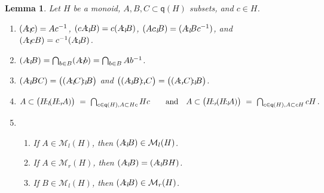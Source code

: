 \documentclass[a4paper]{amsart}
\newtheorem{lemma}[theorem]{Lemma}
\theoremstyle{definition}
\numberwithin{equation}{section}
\begin{document}
\medskip
\begin{lemma} \label{3.2}
Let $H$ be a monoid, $A, B, C \subset \mathsf q (H)$  subsets, and
$c \in H$.
\begin{enumerate}
\item $(A {\negthinspace :_l \negthinspace} c) = Ac^{-1}$, $(cA {\negthinspace :_l \negthinspace} B) = c(A {\negthinspace :_l \negthinspace} B)$, $(Ac {\negthinspace :_l \negthinspace}
      B ) = (A {\negthinspace :_l \negthinspace} Bc^{-1})$, and $(A {\negthinspace :_l \negthinspace} cB) = c^{-1}(A {\negthinspace :_l \negthinspace} B)$.

\smallskip
\item $( A {\negthinspace :_l \negthinspace} B) = \bigcap_{b \in B} (A {\negthinspace :_l \negthinspace} b) = \bigcap_{b \in B} Ab^{-1}$.

\smallskip
\item $(A {\negthinspace :_l \negthinspace} BC) = \big( (A {\negthinspace :_l \negthinspace} C) {\negthinspace :_l \negthinspace} B\big)$ and $\big( (A
      {\negthinspace :_l \negthinspace} B) {\negthinspace :_r \negthinspace} C \big) = \big( (A {\negthinspace :_r \negthinspace} C) {\negthinspace :_l \negthinspace} B \big)$.

\smallskip
\item $
      A \subset \big( H {\negthinspace :_l \negthinspace} (H {\negthinspace :_r \negthinspace} A) \big) \ = \ \bigcap_{c \in \mathsf q (H), A \subset Hc} Hc  \quad  \quad \text{and}
      \quad A \subset \big( H {\negthinspace :_r \negthinspace} (H {\negthinspace :_l \negthinspace} A)\big) \ = \ \bigcap_{c \in \mathsf q (H), A \subset cH} c H \,.
      $

\smallskip
\item \begin{enumerate}
      \item If $A \in \mathcal M_l (H)$, then $(A {\negthinspace :_l \negthinspace} B) \in \mathcal M_l
            (H)$.

      \item If $A \in \mathcal M_r (H)$, then $(A {\negthinspace :_l \negthinspace} B) = (A {\negthinspace :_l \negthinspace} BH)$.

      \item If $B \in \mathcal M_l (H)$, then $(A {\negthinspace :_l \negthinspace} B) \in
            \mathcal M_r (H)$.
      \end{enumerate}
\end{enumerate}
\end{lemma}
\end{document}
